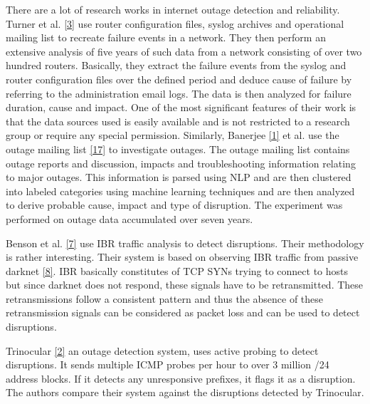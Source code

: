 There are a lot of research works in internet outage detection and reliability. Turner et al. \hyperlink {K3} {[3]} use router configuration files, syslog archives and operational mailing list to recreate failure events in a network. They then perform an extensive analysis of five years of such data from a network consisting of over two hundred routers. Basically, they extract the failure events from the syslog and router configuration files over the defined period and deduce cause of failure by referring to the administration email logs. The data is then analyzed for failure duration, cause and impact. One of the most significant features of their work is that the data sources used is easily available and is not restricted to a research group or require any special permission. Similarly, Banerjee \hyperlink {K1} {[1]} et al. use the outage mailing list \hyperlink{K17}{[17]} to investigate outages. The outage mailing list contains outage reports and discussion, impacts and troubleshooting information relating to major outages. This information is parsed using NLP and are then clustered into labeled categories using machine learning techniques and are then analyzed to derive probable cause, impact and type of disruption. The experiment was performed on outage data accumulated over seven years.

Benson et al. \hyperlink {K7} {[7]} use IBR traffic analysis to detect disruptions. Their methodology is rather interesting. Their system is based on observing IBR traffic from passive darknet \hyperlink {K8} {[8]}. IBR basically constitutes of TCP SYNs trying to connect to hosts but since darknet does not respond, these signals have to be retransmitted. These retransmissions follow a consistent pattern and thus the absence of these retransmission signals can be considered as packet loss and can be used to detect disruptions.

Trinocular \hyperlink {K2} {[2]} an outage detection system, uses active probing to detect disruptions. It sends multiple ICMP probes per hour to over 3 million /24 address blocks. If it detects any unresponsive prefixes, it flags it as a disruption. The authors compare their system against the disruptions detected by Trinocular.
